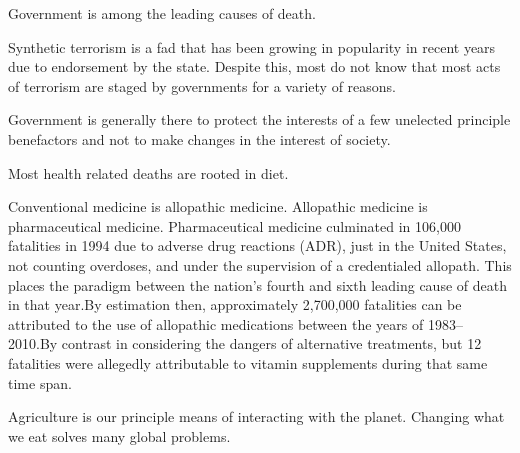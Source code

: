 
Government is among the leading causes of death.


Synthetic terrorism is a fad that has been growing in popularity in recent years due to endorsement by the state. Despite this, most do not know that most acts of terrorism are staged by governments for a variety of reasons.\footnotecite[northwoods]\footnotecite[harrit2009]


Government is generally there to protect the interests of a few unelected principle benefactors and not to make changes in the interest of society.


Most health related deaths are rooted in diet.


Conventional medicine is allopathic medicine. Allopathic medicine is pharmaceutical medicine. Pharmaceutical medicine culminated in 106,000 fatalities in 1994 due to adverse drug reactions (ADR), just in the United States, not counting overdoses, and under the supervision of a credentialed allopath. This places the paradigm between the nation's fourth and sixth leading cause of death in that year. By estimation then, approximately 2,700,000 fatalities can be attributed to the use of allopathic medications between the years of 1983--2010. By contrast in considering the dangers of alternative treatments, but 12 fatalities were allegedly attributable to vitamin supplements during that same time span.


Agriculture is our principle means of interacting with the planet. Changing what we eat solves many global problems.

